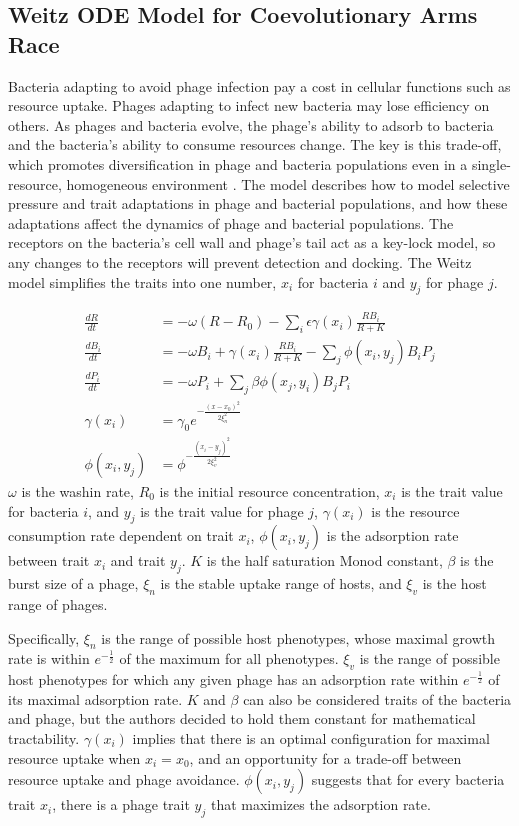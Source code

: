 \subsection{Weitz ODE Model for Coevolutionary Arms Race}
Bacteria adapting to avoid phage infection pay a cost in cellular functions such as resource uptake. 
Phages adapting to infect new bacteria may lose efficiency on others.
As phages and bacteria evolve, the phage's ability to adsorb to bacteria and the bacteria's ability to consume resources change. 
The key is this trade-off, which promotes diversification in phage and bacteria populations even in a single-resource, homogeneous environment \cite{weitzCoevolutionaryArmsRaces2005}. 
The \citet{weitzCoevolutionaryArmsRaces2005} model describes how to model selective pressure and trait adaptations in phage and bacterial populations, and how these adaptations affect the dynamics of phage and bacterial populations. 
The receptors on the bacteria's cell wall and phage's tail act as a key-lock model, so any changes to the receptors will prevent detection and docking. 
The Weitz model simplifies the traits into one number, $x_i$ for bacteria $i$ and $y_j$ for phage $j$. 

\begin{align}
    \frac{dR}{dt} &= -\omega(R-R_0) - \sum_i \epsilon\gamma(x_i)\frac{RB_i}{R+K} \\
    \frac{dB_i}{dt} &= -\omega B_i+ \gamma(x_i)\frac{RB_i}{R+K} - \sum_j \phi(x_i, y_j)B_i P_j \\ 
    \frac{dP_i}{dt} &= -\omega P_i + \sum_j \beta \phi(x_j, y_i)B_j P_i\\
        \gamma(x_i) &= \gamma_0 e^{-\frac{(x-x_0)^2}{2\xi_n^2}}\\
        \phi(x_i, y_j) &= \phi^{-\frac{(x_i-y_j)^2}{2\xi_v^2}}
\end{align}
$\omega$ is the washin rate, $R_0$ is the initial resource concentration, $x_i$ is the trait value for bacteria $i$, and $y_j$ is the trait value for phage $j$, $\gamma(x_i)$ is the resource consumption rate dependent on trait $x_i$, $\phi(x_i, y_j)$ is the adsorption rate between trait $x_i$ and trait $y_j$. 
$K$ is the half saturation Monod constant, $\beta$ is the burst size of a phage, $\xi_n$ is the stable uptake range of hosts, and $\xi_v$ is the host range of phages. 

Specifically, $\xi_n$ is the range of possible host phenotypes, whose maximal growth rate is within $e^{-\frac{1}{2}}$ of the maximum for all phenotypes. 
$\xi_v$ is the range of possible host phenotypes for which any given phage has an adsorption rate within $e^{-\frac{1}{2}}$ of its maximal adsorption rate. 
$K$ and $\beta$ can also be considered traits of the bacteria and phage, but the authors decided to hold them constant for mathematical tractability. 
$\gamma(x_i)$ implies that there is an optimal configuration for maximal resource uptake when $ x_i = x_0$, and an opportunity for a trade-off between resource uptake and phage avoidance. 
$\phi(x_i, y_j)$ suggests that for every bacteria trait $x_i$, there is a phage trait $y_j$ that maximizes the adsorption rate. 

